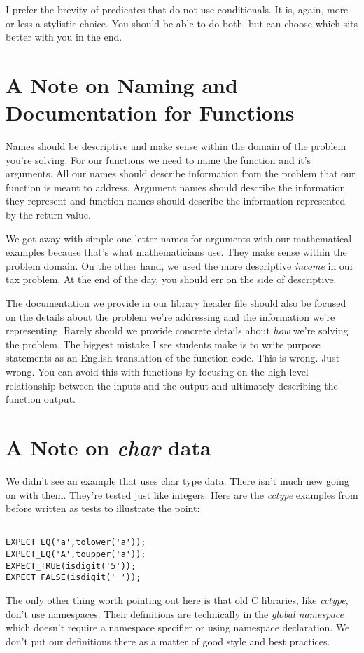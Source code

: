 \documentclass[]{tufte-handout}
\begin{document}
I prefer the brevity of predicates that do not use conditionals.  It is, again, more or less a stylistic choice. You should be able to do both, but can choose which sits better with you in the end. 


\section{A Note on Naming and Documentation for Functions}

Names should be descriptive and make sense within the domain of the problem you're solving. For our functions we need to name the function and it's arguments.  All our names should describe information from the problem that our function is meant to address. Argument names should describe the information they represent and function names should describe the information represented by the return value.

We got away with simple one letter names for arguments with our mathematical examples because that's what mathematicians use.  They make sense within the problem domain.  On the other hand, we used the more descriptive \textit{income} in our tax problem.  At the end of the day, you should err on the side of descriptive.

The documentation we provide in our library header file should also be focused on the details about the problem we're addressing and the information we're representing. Rarely should we provide concrete details about \textit{how} we're solving the problem.  The biggest mistake I see students make is to write purpose statements as an English translation of the function code. This is wrong. Just wrong. You can avoid this with functions by focusing on the high-level relationship between the inputs and the output and ultimately describing the function output.

\section{A Note on \textit{char} data}

We didn't see an example that uses char type data. There isn't much new going on with them. They're tested just like integers. Here are the \textit{cctype} examples from before written as tests to illustrate the point:

\begin{verbatim}

EXPECT_EQ('a',tolower('a'));
EXPECT_EQ('A',toupper('a'));
EXPECT_TRUE(isdigit('5'));
EXPECT_FALSE(isdigit(' '));

\end{verbatim}

The only other thing worth pointing out here is that old C libraries, like \textit{cctype}, don't use namespaces. Their definitions are technically in the \textit{global namespace} which doesn't require a namespace specifier or using namespace declaration. We don't put our definitions there as a matter of good style and best practices. 
\end{document}
